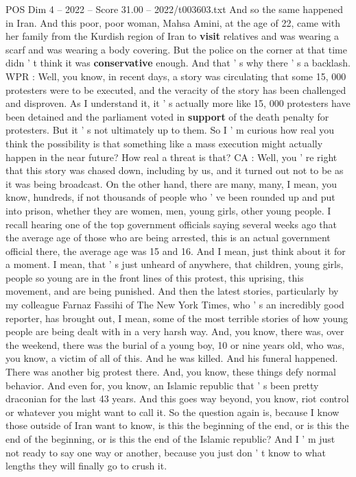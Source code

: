 \begin{textsample}{POS Dim 4 – 2022 – Score 31.00 – 2022/t003603.txt}
And so the same happened in Iran.
And this poor, poor woman, Mahsa Amini, at the age of 22, came with her family from the Kurdish region of Iran to \textbf{visit} relatives and was wearing a scarf and was wearing a body covering.
But the police on the corner at that time didn ' t think it was \textbf{conservative} enough.
And that ' s why there ' s a backlash.
WPR : Well, you know, in recent days, a story was circulating that some 15, 000 protesters were to be executed, and the veracity of the story has been challenged and disproven.
As I understand it, it ' s actually more like 15, 000 protesters have been detained and the parliament voted in \textbf{support} of the death penalty for protesters.
But it ' s not ultimately up to them.
So I ' m curious how real you think the possibility is that something like a mass execution might actually happen in the near future?
How real a threat is that?
CA : Well, you ' re right that this story was chased down, including by us, and it turned out not to be as it was being broadcast.
On the other hand, there are many, many, I mean, you know, hundreds, if not thousands of people who ' ve been rounded up and put into prison, whether they are women, men, young girls, other young people.
I recall hearing one of the top government officials saying several weeks ago that the average age of those who are being arrested, this is an actual government official there, the average age was 15 and 16.
And I mean, just think about it for a moment.
I mean, that ' s just unheard of anywhere, that children, young girls, people so young are in the front lines of this protest, this uprising, this movement, and are being punished.
And then the latest stories, particularly by my colleague Farnaz Fassihi of The New York Times, who ' s an incredibly good reporter, has brought out, I mean, some of the most terrible stories of how young people are being dealt with in a very harsh way.
And, you know, there was, over the weekend, there was the burial of a young boy, 10 or nine years old, who was, you know, a victim of all of this.
And he was killed.
And his funeral happened.
There was another big protest there.
And, you know, these things defy normal behavior.
And even for, you know, an Islamic republic that ' s been pretty draconian for the last 43 years.
And this goes way beyond, you know, riot control or whatever you might want to call it.
So the question again is, because I know those outside of Iran want to know, is this the beginning of the end, or is this the end of the beginning, or is this the end of the Islamic republic?
And I ' m just not ready to say one way or another, because you just don ' t know to what lengths they will finally go to crush it.

\end{textsample}
